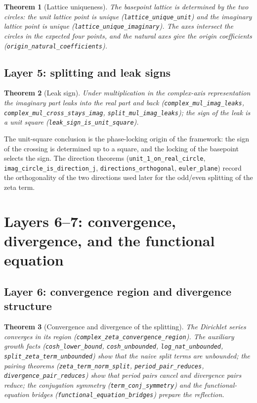 \documentclass{article}
\newtheorem{theorem}{Theorem}[section]
\begin{document}
\begin{theorem}[Lattice uniqueness]
\label{thm:lattice}
The basepoint lattice is determined by the two circles:
the unit lattice point is unique (\texttt{lattice\_unique\_unit}) and the
imaginary lattice point is unique (\texttt{lattice\_unique\_imaginary}).
The axes intersect the circles in the expected four points, and the natural
axes give the origin coefficients
(\texttt{origin\_natural\_coefficients}).
\end{theorem}

\subsection{Layer 5: splitting and leak signs}
\label{sec:L5}

\begin{theorem}[Leak sign]
\label{thm:leak}
Under multiplication in the complex-axis representation the imaginary part
leaks into the real part and back
(\texttt{complex\_mul\_imag\_leaks},
\texttt{complex\_mul\_cross\_stays\_imag},
\texttt{split\_mul\_imag\_leaks}); the sign of the leak is a unit square
(\texttt{leak\_sign\_is\_unit\_square}).
\end{theorem}

The unit-square conclusion is the phase-locking origin of the framework: the
sign of the crossing is determined up to a square, and the locking of the
basepoint selects the sign. The direction theorems
(\texttt{unit\_1\_on\_real\_circle}, \texttt{imag\_circle\_is\_direction\_j},
\texttt{directions\_orthogonal}, \texttt{euler\_plane}) record the
orthogonality of the two directions used later for the odd/even splitting of
the zeta term.

\section{Layers 6--7: convergence, divergence, and the functional equation}
\label{sec:L6}

\subsection{Layer 6: convergence region and divergence structure}
\label{sec:L6a}

\begin{theorem}[Convergence and divergence of the splitting]
\label{thm:divergence}
The Dirichlet series converges in its region
(\texttt{complex\_zeta\_convergence\_region}). The auxiliary growth facts
(\texttt{cosh\_lower\_bound}, \texttt{cosh\_unbounded},
\texttt{log\_nat\_unbounded}, \texttt{split\_zeta\_term\_unbounded}) show
that the naive split terms are unbounded; the pairing theorems
(\texttt{zeta\_term\_norm\_split}, \texttt{period\_pair\_reduces},
\texttt{divergence\_pair\_reduces}) show that period pairs cancel and
divergence pairs reduce; the conjugation symmetry
(\texttt{term\_conj\_symmetry}) and the functional-equation bridges
(\texttt{functional\_equation\_bridges}) prepare the reflection.
\end{theorem}
\end{document}
